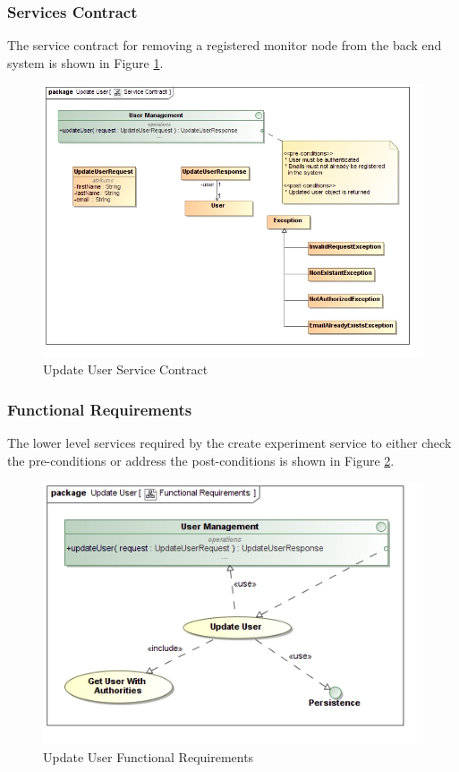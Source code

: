\subsubsection{Services Contract}
The service contract for removing a registered monitor node from the back end 
system is shown in Figure \ref{fig:updateUserServicesContract}.
\begin{figure}[H]
	\begin{center}
		\includegraphics[scale=0.4]{../Diagrams and Charts/User Management/Update User Service Contract.jpg}
		\caption{Update User Service Contract}
		\label{fig:updateUserServicesContract}
	\end{center}
\end{figure}

\subsubsection{Functional Requirements}
The lower level services required by the create experiment service to 
either check the pre-conditions or address the post-conditions is shown in
Figure \ref{fig:updateUserFunctionalRequirements}.
\begin{figure}[H]
	\begin{center}
		\includegraphics[scale=0.4]{../Diagrams and Charts/User Management/Update User Functional Requirements.jpg}
		\caption{Update User Functional Requirements}
		\label{fig:updateUserFunctionalRequirements}
	\end{center}	
\end{figure}
